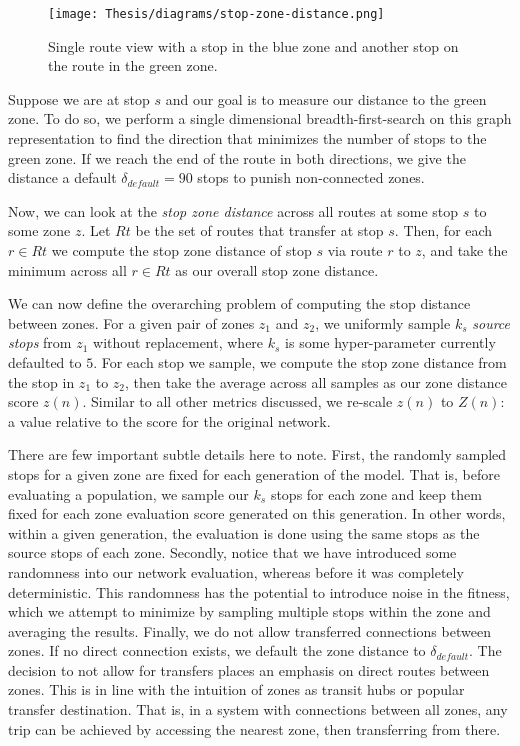 \documentclass[11pt]{amsart}
\theoremstyle{definition}                  %
\theoremstyle{remark}                       %
\numberwithin{equation}{section}
\begin{document}
\begin{figure}[H]
    \centering
    \texttt{[image: Thesis/diagrams/stop-zone-distance.png]}
    \caption{Single route view with a stop in the blue zone and another stop on the route in the green zone.}
    \label{fig:zone-distance}
\end{figure}
Suppose we are at stop $s$ and our goal is to measure our distance to the green zone. To do so, we perform a single dimensional breadth-first-search on this graph representation to find the direction that minimizes the number of stops to the green zone. If we reach the end of the route in both directions, we give the distance a default $\delta_{default}= 90$ stops to punish non-connected zones. 

Now, we can look at the \textit{stop zone distance} across all routes at some stop $s$ to some zone $z$. Let $Rt$ be the set of routes that transfer at stop $s$. Then, for each $r \in Rt$ we compute the stop zone distance of stop $s$ via route $r$ to $z$, and take the minimum across all $r \in Rt$ as our overall stop zone distance. 

We can now define the overarching problem of computing the stop distance between zones. For a given pair of zones $z_1$ and $z_2$, we uniformly sample $k_{s}$ \textit{source stops} from $z_1$ without replacement, where $k_{s}$ is some hyper-parameter currently defaulted to $5$. For each stop we sample, we compute the stop zone distance from the stop in $z_1$ to $z_2$, then take the average across all samples as our zone distance score $z(n)$. Similar to all other metrics discussed, we re-scale $z(n)$ to $Z(n)$: a value relative to the score for the original network. 

There are few important subtle details here to note. First, the randomly sampled stops for a given zone are fixed for each generation of the model. That is, before evaluating a population, we sample our $k_s$ stops for each zone and keep them fixed for each zone evaluation score generated on this generation. In other words, within a given generation, the evaluation is done using the same stops as the source stops of each zone. Secondly, notice that we have introduced some randomness into our network evaluation, whereas before it was completely deterministic. This randomness has the potential to introduce noise in the fitness, which we attempt to minimize by sampling multiple stops within the zone and averaging the results. Finally, we do not allow transferred connections between zones. If no direct connection exists, we default the zone distance to $\delta_{default}$. The decision to not allow for transfers places an emphasis on direct routes between zones. This is in line with the intuition of zones as transit hubs or popular transfer destination. That is, in a system with connections between all zones, any trip can be achieved by accessing the nearest zone, then transferring from there. 
\end{document}
